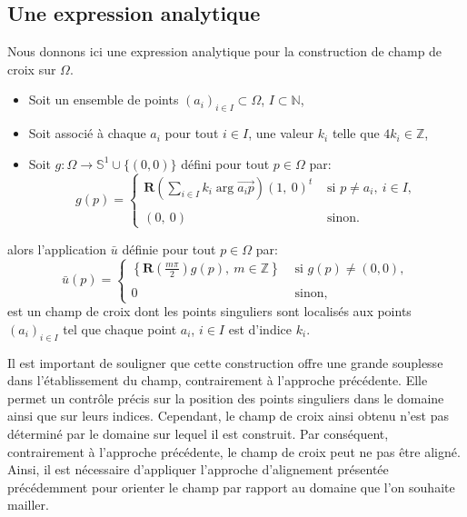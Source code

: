 \subsection{Une expression analytique}

Nous donnons ici une expression analytique pour la construction de champ de croix sur $\Omega$.\\
\begin{itemize}
\item Soit un ensemble de points $(a_i)_{i\in I}\subset\Omega$, $I\subset\mathbb{N}$,\\
\item Soit associé à chaque $a_i$ pour tout $i\in I$, une valeur $k_i$ telle que $4k_i\in\mathbb{Z}$,\\
\item Soit $g:\Omega\longrightarrow\mathbb{S}^1\cup\{(0,0)\}$ défini pour tout $p\in\Omega$ par:\\
\begin{equation}
g(p)=
\left\{
\begin{array}{ll}
\mathbf{R}\left(\displaystyle\sum_{i\in I} k_i\arg{\overrightarrow{a_ip}}\right)(1,~0)^t&\mbox{ si }p\neq a_i,~i\in I,\\\\
(0,~0) &\mbox{ sinon}.
\end{array}
\right.
\end{equation}
\end{itemize}
alors l'application $\bar{u}$ définie pour tout $p\in\Omega$ par:\\
\begin{equation}
\bar{u}(p)=
\left\{
\begin{array}{ll}
\displaystyle\left\{\mathbf{R}\left(\frac{m\pi}{2}\right)g(p),~ m\in \mathbb{Z}\right\} &\mbox{ si }g(p)\neq (0,0),\\\\
0& \text{ sinon},
\end{array}
\right.
\end{equation}
est un champ de croix dont les points singuliers sont localisés aux points $(a_i)_{i\in I}$ tel que chaque point $a_i$, $i\in I$ est d'indice $k_i$.

Il est important de souligner que cette construction offre une grande souplesse dans l'établissement du champ, contrairement à l'approche précédente. Elle permet un contrôle précis sur la position des points singuliers dans le domaine ainsi que sur leurs indices. Cependant, le champ de croix ainsi obtenu n'est pas déterminé par le domaine sur lequel il est construit. Par conséquent, contrairement à l'approche précédente, le champ de croix peut ne pas être aligné. Ainsi, il est nécessaire d'appliquer l'approche d'alignement présentée précédemment pour orienter le champ par rapport au domaine que l'on souhaite mailler.

